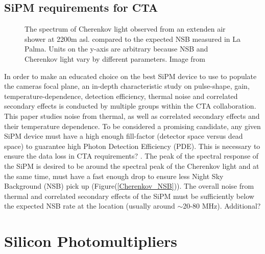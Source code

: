 \documentclass[12pt,article,type=msc,colorback,accentcolor=tud9c]{tudthesis}
\begin{document}
\subsection{SiPM requirements for CTA}
\begin{figure}[t]
\begin{centering}
\caption{The spectrum of Cherenkov light observed from an extenden air shower at 2200m asl. compared to the expected NSB measured in La Palma. Units on the y-axis are arbitrary because NSB and Cherenkov light vary by different parameters. Image from \cite{SiPMvsMAPMT}}
\label{fig:Cherenkov_NSB}
\end{centering}
\end{figure}

In order to make an educated choice on the best SiPM device to use to populate the cameras focal plane, an in-depth characteristic study on pulse-shape, gain, temperature-dependence, detection efficiency, thermal noise and correlated secondary effects is conducted by multiple groups within the CTA collaboration.\\
This paper studies noise from thermal, as well as correlated secondary effects and their temperature dependence. 
To be considered a promising candidate, any given SiPM device must have a high enough fill-factor (detector space versus dead space) to guarantee high Photon Detection Efficiency (PDE). This is necessary to ensure the data loss in CTA requirements? . The peak of the spectral response of the SiPM is desired to be around the spectral peak of the Cherenkov light and at the same time, must have a fast enough drop to ensure less Night Sky Background (NSB) pick up (Figure(\ref{Cherenkov_NSB})). The overall noise from thermal and correlated secondary effects of the SiPM must be sufficiently below the expected NSB rate at the location (usually around $\sim$20-80 MHz). Additional?



\clearpage
\section{\Large Silicon Photomultipliers}
\label{sec:SiPM}
\end{document}
